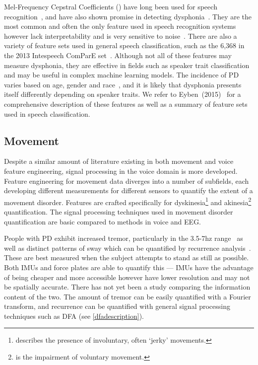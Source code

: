 \documentclass[12pt, twoside]{book}
\renewcommand\emph[1]{\textit{\color{USred}{#1}}}
\begin{document}
Mel-Frequency Cepstral Coefficients (\emph{MFCC}) have long been used for speech recognition~\cite{mfcc}, and have also shown promise in detecting dysphonia~\cite{mfccml}. They are the most common and often the only feature used in speech recognition systems however lack interpretability and is very sensitive to noise~\cite{mfccrobust}. There are also a variety of feature sets used in general speech classification, such as the 6,368 in the 2013 Intespeech ComParE set~\cite{is2013}. Although not all of these features may measure dysphonia, they are effective in fields such as speaker trait classification and may be useful in complex machine learning models. The incidence of PD varies based on age, gender and race~\cite{ageracial,racial}, and it is likely that dysphonia presents itself differently depending on speaker traits. We refer to Eyben~(2015)~\cite{ostextbook} for a comprehensive description of these features as well as a summary of feature sets used in speech classification.

\subsection{Movement}\label{movementfeatures}
Despite a similar amount of literature existing in both movement and voice feature engineering, signal processing in the voice domain is more developed. Feature engineering for movement data diverges into a number of subfields, each developing different measurements for different sensors to quantify the extent of a movement disorder. Features are crafted specifically for dyskinesia\footnote{\emph{Dyskinesia} describes the presence of involuntary, often `jerky' movements.} and akinesia\footnote{\emph{Akinesia} is the impairment of voluntary movement.} quantification. The signal processing techniques used in movement disorder quantification are basic compared to methods in voice and EEG.

People with PD exhibit increased tremor, particularly in the 3.5-7hz range~\cite{duval2004detection} as well as distinct patterns of sway which can be quantified by recurrence analysis~\cite{palmerini2011tremor, posturalswaylongitudinal}. These are best measured when the subject attempts to stand as still as possible. Both IMUs and force plates are able to quantify this --- IMUs have the advantage of being cheaper and more accessible however have lower resolution and may not be spatially accurate. There has not yet been a study comparing the information content of the two. The amount of tremor can be easily quantified with a Fourier transform, and recurrence can be quantified with general signal processing techniques such as DFA (see \ref{dfadescription}).
\end{document}

